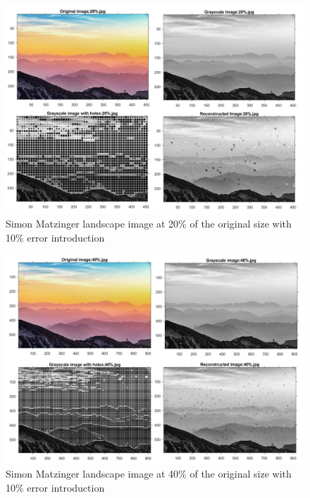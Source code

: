 \begin{figure}[!ht]
\center \includegraphics[scale=0.31]{SimonMatzinger20.jpg}
\caption{Simon Matzinger landscape image at 20\% of the original size with 10\% error introduction}
\label{fig:SimonMatzinger20}
\end{figure}

\begin{figure}[!ht]
\center \includegraphics[scale=0.31]{SimonMatzinger40.jpg}
\caption{Simon Matzinger landscape image at 40\% of the original size with 10\% error introduction}
\label{fig:SimonMatzinger40}
\end{figure}


